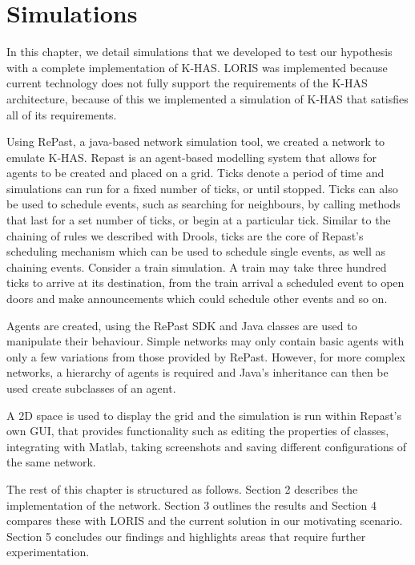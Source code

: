 \chapter{Simulations}
In this chapter, we detail simulations that we developed to test our hypothesis with a complete implementation of K-HAS. LORIS was implemented because current technology does not fully support the requirements of the K-HAS architecture, because of this we implemented a simulation of K-HAS that satisfies all of its requirements.

Using RePast, a java-based network simulation tool, we created a network to emulate K-HAS. Repast is an agent-based modelling system that allows for agents to be created and placed on a grid. Ticks denote a period of time and simulations can run for a fixed number of ticks, or until stopped. Ticks can also be used to schedule events, such as searching for neighbours, by calling methods that last for a set number of ticks, or begin at a particular tick. Similar to the chaining of rules we described with Drools, ticks are the core of Repast's scheduling mechanism which can be used to schedule single events, as well as chaining events. Consider a train simulation. A train may take three hundred ticks to arrive at its destination, from the train arrival a scheduled event to open doors and make announcements which could schedule other events and so on.

Agents are created, using the RePast SDK and Java classes are used to manipulate their behaviour. Simple networks may only contain basic agents with only a few variations from those provided by RePast. However, for more complex networks, a hierarchy of agents is required and Java's inheritance can then be used create subclasses of an agent.

A 2D space is used to display the grid and the simulation is run within Repast's own GUI, that provides functionality such as editing the properties of classes, integrating with Matlab, taking screenshots and saving different configurations of the same network.

The rest of this chapter is structured as follows. Section 2 describes the implementation of the network. Section 3 outlines the results and Section 4 compares these with LORIS and the current solution in our motivating scenario. Section 5 concludes our findings and highlights areas that require further experimentation.

